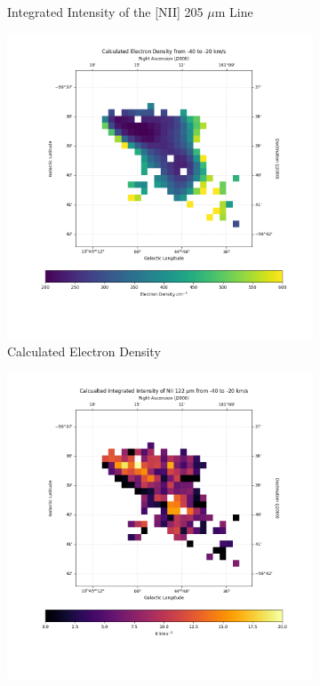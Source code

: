 \begin{figure}
\begin{subfigure}[t]{0.49\textwidth}
        \caption{Integrated Intensity of the [NII] 205 $\mu$m Line}
    \end{subfigure}
    \begin{subfigure}[t]{0.49\textwidth}
        \centering
        \includegraphics[width=\textwidth]{figs/carina/keyhole/ne.png}
        \caption{Calculated Electron Density}
    \end{subfigure}
    \begin{subfigure}[t]{0.49\textwidth}
        \centering
        \includegraphics[width=\textwidth]{figs/carina/keyhole/122.png}

\end{subfigure}
\end{figure}
